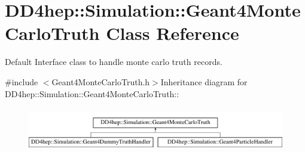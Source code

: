 \hypertarget{class_d_d4hep_1_1_simulation_1_1_geant4_monte_carlo_truth}{
\section{DD4hep::Simulation::Geant4MonteCarloTruth Class Reference}
\label{class_d_d4hep_1_1_simulation_1_1_geant4_monte_carlo_truth}
}


Default Interface class to handle monte carlo truth records.  


{\ttfamily \#include $<$Geant4MonteCarloTruth.h$>$}Inheritance diagram for DD4hep::Simulation::Geant4MonteCarloTruth::\begin{figure}[H]
\begin{center}
\leavevmode
\includegraphics[height=1.93103cm]{class_d_d4hep_1_1_simulation_1_1_geant4_monte_carlo_truth}
\end{center}
\end{figure}
